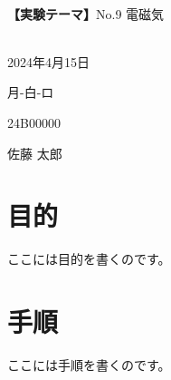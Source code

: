 \documentclass[12pt, a4paper]{ltjsreport}
\begin{document}
\begin{multicols}{2}
\vspace*{5px}
\\
{\large \textbf{【実験テーマ】}No.9 電磁気}
\vspace*{10px}
\\
\\
\begin{description}[labelwidth=6.0em]
  \setlength{\leftskip}{3.8cm}
  \item[実験日] 2024年4月15日
  \item[曜日-組-班] 月-白-ロ
  \item[学籍番号] 24B00000
  \item[名前] 佐藤 太郎
\end{description}
\end{multicols}

\section*{目的}
ここには目的を書くのです。
\section*{手順}
ここには手順を書くのです。
\end{document}
